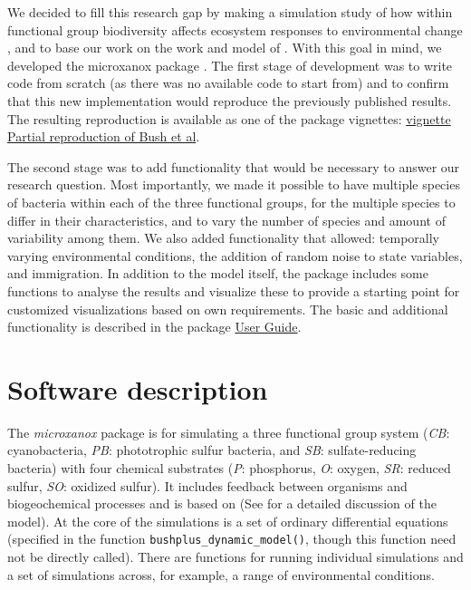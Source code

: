 \documentclass[preprint,12pt, a4paper]{elsarticle}
\begin{document}
We decided to fill this research gap by making a simulation study of how
within functional group biodiversity affects ecosystem responses to
environmental change \citet{Limberger2022}, and to base our work on the
work and model of \citet{Bush2017}. With this goal in mind, we developed
the microxanox package \citep{Krug2022}. The first stage of development
was to write code from scratch (as there was no available code to start
from) and to confirm that this new implementation would reproduce the
previously published results. The resulting reproduction is available as
one of the package vignettes:
\href{https://uzh-peg.r-universe.dev/articles/microxanox/partial-reproduction-Bushetal2017.html}{vignette
Partial reproduction of Bush et al}.

The second stage was to add functionality that would be necessary to
answer our research question. Most importantly, we made it possible to
have multiple species of bacteria within each of the three functional
groups, for the multiple species to differ in their characteristics, and
to vary the number of species and amount of variability among them. We
also added functionality that allowed: temporally varying environmental
conditions, the addition of random noise to state variables, and
immigration. In addition to the model itself, the package includes some
functions to analyse the results and visualize these to provide a
starting point for customized visualizations based on own requirements.
The basic and additional functionality is described in the package
\href{https://uzh-peg.r-universe.dev/articles/microxanox/User-guide.html}{User
Guide}.

\hypertarget{software-description}{%
\section{Software description}\label{software-description}}

The \emph{microxanox} package is for simulating a three functional group
system (\emph{CB}: cyanobacteria, \emph{PB}: phototrophic sulfur
bacteria, and \emph{SB}: sulfate-reducing bacteria) with four chemical
substrates (\emph{P}: phosphorus, \emph{O}: oxygen, \emph{SR}: reduced
sulfur, \emph{SO}: oxidized sulfur). It includes feedback between
organisms and biogeochemical processes and is based on \citet{Bush2017}
(See \citet{Bush2017} for a detailed discussion of the model). At the
core of the simulations is a set of ordinary differential equations
(specified in the function \texttt{bushplus\_dynamic\_model()}, though
this function need not be directly called). There are functions for
running individual simulations and a set of simulations across, for
example, a range of environmental conditions.
\end{document}
